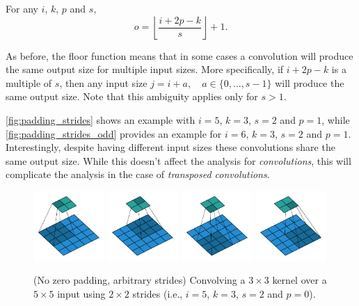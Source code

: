 \begin{relationship}\label{rel:padding_strides}
For any $i$, $k$, $p$ and $s$,
\begin{equation*}
    o = \left\lfloor \frac{i + 2p - k}{s} \right\rfloor + 1.
\end{equation*}
\end{relationship}

\noindent As before, the floor function means that in some cases a convolution
will produce the same output size for multiple input sizes. More specifically,
if $i + 2p - k$ is a multiple of $s$, then any input size $j = i + a, \quad a
\in \{0,\ldots,s - 1\}$ will produce the same output size. Note that this
ambiguity applies only for $s > 1$.

\autoref{fig:padding_strides} shows an example with $i = 5$, $k = 3$, $s = 2$
and $p = 1$, while \autoref{fig:padding_strides_odd} provides an example for
$i = 6$, $k = 3$, $s = 2$ and $p = 1$. Interestingly, despite having different
input sizes these convolutions share the same output size. While this doesn't
affect the analysis for {\em convolutions}, this will complicate the analysis
in the case of {\em transposed convolutions}.

\begin{figure}[p]
    \centering
    \includegraphics[width=0.24\textwidth]{pdf/no_padding_strides_00.pdf}
    \includegraphics[width=0.24\textwidth]{pdf/no_padding_strides_01.pdf}
    \includegraphics[width=0.24\textwidth]{pdf/no_padding_strides_02.pdf}
    \includegraphics[width=0.24\textwidth]{pdf/no_padding_strides_03.pdf}
    \caption{\label{fig:no_padding_strides} (No zero padding, arbitrary
        strides) Convolving a $3 \times 3$ kernel over a $5 \times 5$ input
        using $2 \times 2$ strides (i.e., $i = 5$, $k = 3$, $s = 2$ and
        $p = 0$).}
\end{figure}

